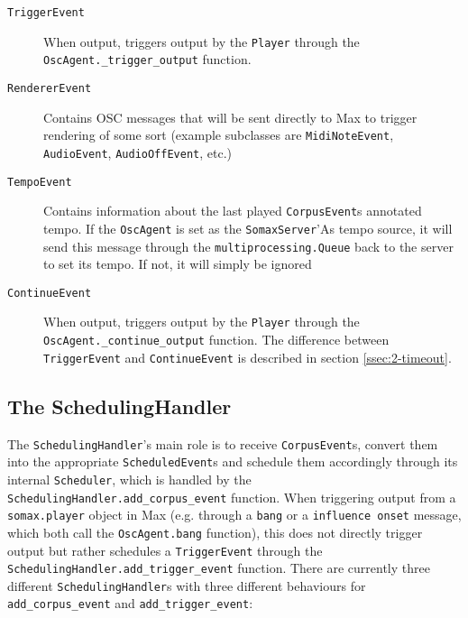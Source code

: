 \begin{description}
	\item[\texttt{TriggerEvent}] When output, triggers output by the \texttt{Player} through the \\\texttt{OscAgent.\_trigger\_output} function.
	\item[\texttt{RendererEvent}] Contains OSC messages that will be sent directly to Max to trigger rendering of some sort (example subclasses are \texttt{MidiNoteEvent}, \texttt{AudioEvent}, \texttt{AudioOffEvent}, etc.)
	\item[\texttt{TempoEvent}] Contains information about the last played \texttt{CorpusEvent}s annotated tempo. If the \texttt{OscAgent} is set as the \texttt{SomaxServer}'As tempo source, it will send this message through the \texttt{multiprocessing.Queue} back to the server to set its tempo. If not, it will simply be ignored
	\item[\texttt{ContinueEvent}] When output, triggers output by the \texttt{Player} through the \\ \texttt{OscAgent.\_continue\_output} function. The difference between \texttt{TriggerEvent} and \texttt{ContinueEvent} is described in section \ref{ssec:2-timeout}.
\end{description}



\subsection{The SchedulingHandler}\label{ssec:2-scheduling-handler}
The \texttt{SchedulingHandler}'s main role is to receive \texttt{CorpusEvent}s, convert them into the appropriate \texttt{ScheduledEvent}s and schedule them accordingly through its internal \texttt{Scheduler}, which is handled by the \texttt{SchedulingHandler.add\_corpus\_event} function. When triggering output from a \texttt{somax.player} object in Max (e.g. through a \texttt{bang} or a \texttt{influence onset} message, which both call the \texttt{OscAgent.bang} function), this does not directly trigger output but rather schedules a \texttt{TriggerEvent} through the \texttt{SchedulingHandler.add\_trigger\_event} function. There are currently three different \texttt{SchedulingHandler}s with three different behaviours for \texttt{add\_corpus\_event} and \texttt{add\_trigger\_event}:

